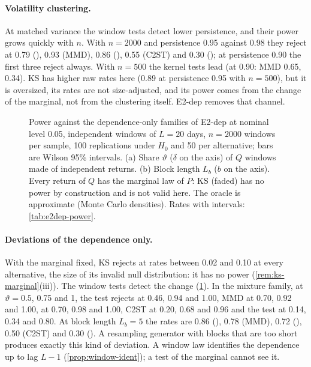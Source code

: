 \paragraph{Volatility clustering.}
At matched variance the window tests detect lower persistence, and their power grows quickly with
$n$. With $n=2000$ and persistence 0.95 against 0.98 they reject at 0.79 (\WC{}), 0.93 (MMD), 0.86
(\SigMMD{}), 0.55 (C2ST) and 0.30 (\LRC{}); at persistence 0.90 the first three reject always. With
$n=500$ the kernel tests lead (at 0.90: MMD 0.65, \WC{} 0.34). KS has higher raw rates here (0.89 at
persistence 0.95 with $n=500$), but it is oversized, its rates are not size-adjusted, and its power
comes from the change of the marginal, not from the clustering itself. E2-dep removes that channel.

\begin{figure}[tbp]
  \centering
  \caption{Power against the dependence-only families of E2-dep at nominal level 0.05,
    independent windows of $L=20$ days, $n=2000$ windows per sample, 100 replications under $H_0$
    and 50 per alternative; bars are Wilson 95\% intervals. (a) Share $\vartheta$ ($\delta$ on the
    axis) of $Q$ windows made of independent returns. (b) Block length $L_b$ ($b$ on the axis).
    Every return of $Q$ has the marginal law of $P$: KS (faded) has no power by construction and is
    not valid here. The oracle is approximate (Monte Carlo densities). Rates with intervals:
    \cref{tab:e2dep-power}.}
  \label{fig:e2dep-power}
\end{figure}

\paragraph{Deviations of the dependence only.}
With the marginal fixed, KS rejects at rates between 0.02 and 0.10 at every alternative, the size
of its invalid null distribution: it has no power (\cref{rem:ks-marginal}(iii)). The window tests
detect the change (\cref{fig:e2dep-power}). In the mixture family, at $\vartheta=0.5$, 0.75 and 1,
the \WC{} test rejects at 0.46, 0.94 and 1.00, MMD at 0.70, 0.92 and 1.00, \SigMMD{} at 0.70, 0.98
and 1.00, C2ST at 0.20, 0.68 and 0.96 and the \LRC{} test at 0.14, 0.34 and 0.80. At block length
$L_b=5$ the rates are 0.86 (\WC{}), 0.78 (MMD), 0.72 (\SigMMD{}), 0.50 (C2ST) and 0.30 (\LRC{}). A
resampling generator with blocks that are too short produces exactly this kind of deviation. A
window law identifies the dependence up to lag $L-1$ (\cref{prop:window-ident}); a test of the
marginal cannot see it.

